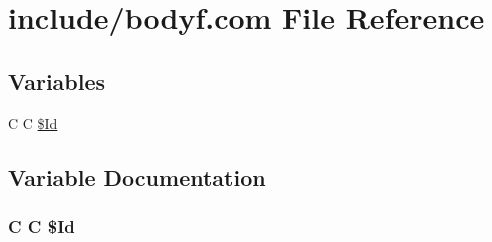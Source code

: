 \hypertarget{bodyf_8com}{\section{include/bodyf.com File Reference}
\label{bodyf_8com}
}
\subsection*{Variables}
\begin{DoxyCompactItemize}
\item 
C C \hyperlink{bodyf_8com_af40bd3a96fc1553c00422342f92046b8}{\$\-Id}
\end{DoxyCompactItemize}


\subsection{Variable Documentation}
\hypertarget{bodyf_8com_af40bd3a96fc1553c00422342f92046b8}{
\subsubsection[{\$\-Id}]{\setlength{\rightskip}{0pt plus 5cm}C C \$Id}}\label{bodyf_8com_af40bd3a96fc1553c00422342f92046b8}
